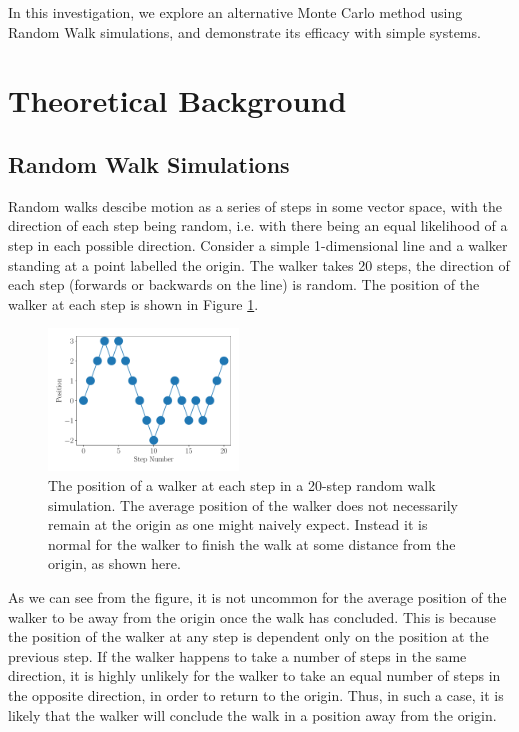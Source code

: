 \documentclass[journal]{IEEEtran}
\begin{document}
In this investigation, we explore an alternative Monte Carlo method using Random
Walk simulations, and demonstrate its efficacy with simple systems.


\section{Theoretical Background}
\label{sec:TheoreticalBackground}

\subsection{Random Walk Simulations}

Random walks descibe motion as a series of steps in some vector space, with the
direction of each step being random, i.e. with there being an equal likelihood
of a step in each possible direction. Consider a simple 1-dimensional line and a
walker standing at a point labelled the origin. The walker takes 20 steps, the
direction of each step (forwards or backwards on the line) is random. The
position of the walker at each step is shown in Figure \ref{fig:cartoon}.

\begin{figure}[H]%
  \begin{center}
    \includegraphics[width=0.45\textwidth]{images/cartoon.pdf}
    \caption{The position of a walker at each step in a 20-step random walk
      simulation. The average position of the walker does not necessarily remain
      at the origin as one might naively expect. Instead it is normal for the
      walker to finish the walk at some distance from the origin, as shown here.}
    \label{fig:cartoon}
  \end{center}
\end{figure}

As we can see from the figure, it is not uncommon for the average position of
the walker to be away from the origin once the walk has concluded. This is
because the position of the walker at any step is dependent only on the position
at the previous step. If the walker happens to take a number of steps in the
same direction, it is highly unlikely for the walker to take an equal number of
steps in the opposite direction, in order to return to the origin. Thus, in such
a case, it is likely that the walker will conclude the walk in a position away
from the origin.
\end{document}
